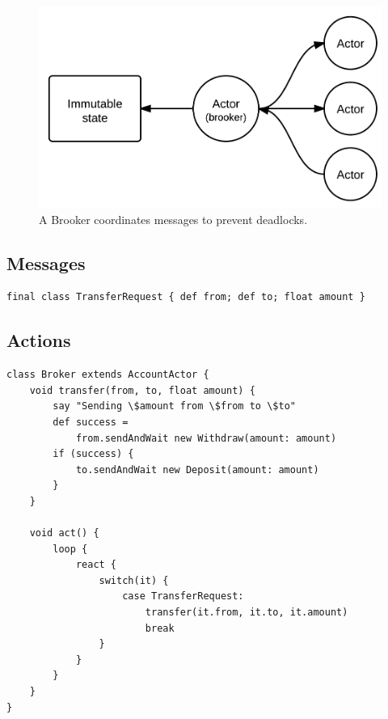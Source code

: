 \documentclass[a4paper,12pt]{kth-mag}
\begin{document}
\begin{figure}[H]
    \begin{center}
    \includegraphics{images/ActorsBrooker.png}
    \end{center}
    \caption{A Brooker coordinates messages to prevent deadlocks.}
    \label{fig:actorsBrooker}
\end{figure}

\subsection{Messages}

\begin{listing}[H]
	\begin{verbatim}
final class TransferRequest { def from; def to; float amount }
	\end{verbatim}
\end{listing}

\subsection{Actions}

\begin{listing}[H]
	\begin{verbatim}
class Broker extends AccountActor {
    void transfer(from, to, float amount) {
        say "Sending \$amount from \$from to \$to"
        def success = 
            from.sendAndWait new Withdraw(amount: amount)
        if (success) { 
            to.sendAndWait new Deposit(amount: amount) 
        } 
    }

    void act() {
        loop {
            react { 
                switch(it) {
                    case TransferRequest:
                        transfer(it.from, it.to, it.amount)
                        break
                }
            }
        }
    }
}
	\end{verbatim}
\end{listing}
\end{document}
